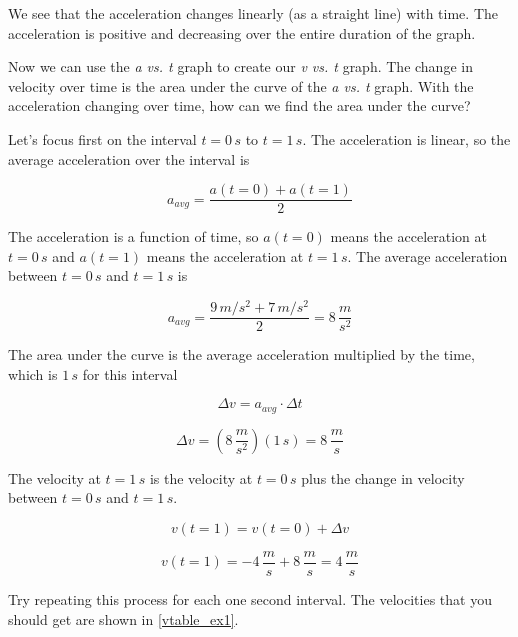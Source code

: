\documentclass[12pt]{book}
\begin{document}
We see that the acceleration changes linearly (as a straight line) with time. The acceleration is positive and decreasing over the entire duration of the graph.

Now we can use the \textit{a vs. t} graph to create our \textit{v vs. t} graph. The change in velocity over time is the area under the curve of the \textit{a vs. t} graph. With the acceleration changing over time, how can we find the area under the curve?

Let's focus first on the interval $t = 0 \, s$ to $t = 1 \, s$. The acceleration is linear, so the average acceleration over the interval is 

\begin{equation}
a_{avg} = \frac{a(t=0) + a(t=1)}{2}
\end{equation}

The acceleration is a function of time, so $a(t=0)$ means the acceleration at $t = 0 \, s$ and $a(t=1)$ means the acceleration at $t = 1 \, s$. The average acceleration between $t = 0 \, s$ and $t = 1 \, s$ is

\begin{equation}
a_{avg} = \frac{9 \, m/s^2 + 7 \, m/s^2}{2} = 8 \, \frac{m}{s^2}
\end{equation}

The area under the curve is the average acceleration multiplied by the time, which is $1 \, s$ for this interval

\begin{equation}
\Delta v = a_{avg} \cdot \Delta t
\end{equation}

\begin{equation}
\Delta v = (8 \, \frac{m}{s^2}) (1 \, s) = 8 \, \frac{m}{s}
\end{equation}

The velocity at $t = 1 \, s$ is the velocity at $t = 0 \, s$ plus the change in velocity between $t = 0 \, s$ and $t = 1 \, s$.

\begin{equation}
v(t=1) = v(t=0) + \Delta v
\end{equation}

\begin{equation}
v(t=1) = -4 \, \frac{m}{s} + 8 \, \frac{m}{s} = 4 \, \frac{m}{s}
\end{equation}

Try repeating this process for each one second interval. The velocities that you should get are shown in \ref{vtable_ex1}.
\end{document}
